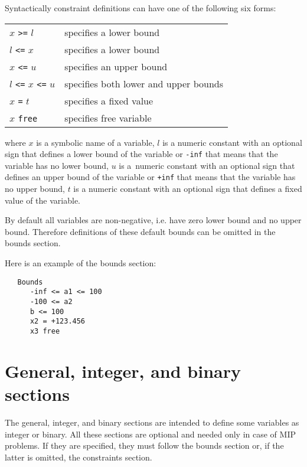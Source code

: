 
Syntactically constraint definitions can have one of the following six
forms:

\begin{center}
\begin{tabular}{ll}
$x$ \verb|>=| $l$ &              specifies a lower bound \\
$l$ \verb|<=| $x$ &              specifies a lower bound \\
$x$ \verb|<=| $u$ &              specifies an upper bound \\
$l$ \verb|<=| $x$ \verb|<=| $u$ &specifies both lower and upper bounds\\
$x$ \verb|=| $t$                &specifies a fixed value \\
$x$ \verb|free|                 &specifies free variable
\end{tabular}
\end{center}

\noindent
where $x$ is a symbolic name of a variable, $l$ is a numeric constant
with an optional sign that defines a lower bound of the variable or
\verb|-inf| that means that the variable has no lower bound, $u$ is
a~numeric constant with an optional sign that defines an upper bound of
the variable or \verb|+inf| that means that the variable has no upper
bound, $t$ is a numeric constant with an optional sign that defines a
fixed value of the variable.

By default all variables are non-negative, i.e. have zero lower bound
and no upper bound. Therefore definitions of these default bounds can
be omitted in the bounds section.

Here is an example of the bounds section:

\begin{verbatim}
   Bounds
      -inf <= a1 <= 100
      -100 <= a2
      b <= 100
      x2 = +123.456
      x3 free
\end{verbatim}

\section{General, integer, and binary sections}

The general, integer, and binary sections are intended to define
some variables as integer or binary. All these sections are optional
and needed only in case of MIP problems. If they are specified, they
must follow the bounds section or, if the latter is omitted, the
constraints section.

